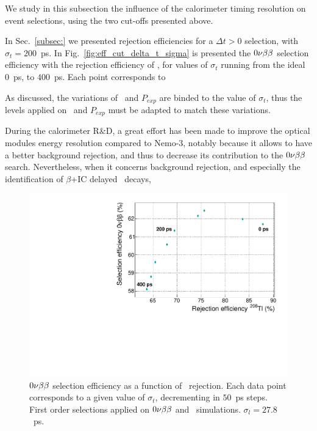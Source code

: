 We study in this subsection the influence of the calorimeter timing resolution on event selections, using the two cut-offs presented above.

In Sec.~\ref{subsec:} we presented rejection efficiencies for a ${\Delta t>0}$ selection, with ${\sigma_{t}=200}$~ps.
In Fig.~\ref{fig:eff_cut_delta_t_sigma} is presented the $0\nu\beta\beta$ selection efficiency with the rejection efficiency of \Tl, for values of $\sigma_{t}$ running from the ideal $0$~ps, to $400$~ps.
Each point corresponds to

As discussed, the variations of \Pint\ and $P_{exp}$ are binded to the value of $\sigma_{t}$, thus the levels applied on \Pint\ and $P_{exp}$ must be adapted to match these variations.


During the calorimeter R\&D, a great effort has been made to improve the optical modules energy resolution compared to Nemo-$3$, notably because it allows to have a better background rejection, and thus to decrease its contribution to the $0\nu\beta\beta$ search.
Nevertheless, when it concerns background rejection, and especially the identification of $\beta$+IC delayed \Tl\ decays,


\begin{figure}[!h]
  \centering
  \includegraphics[width=13cm]{timedifference/fig_timediff/efficiency_proba.pdf}
  \caption{$0\nu\beta\beta$ selection efficiency as a function of \Tl\ rejection.
    Each data point corresponds to a given value of $\sigma_{t}$, decrementing in $50$~ps steps.
    First order selections applied on $0\nu\beta\beta$ and \Tl\ simulations.
    $\sigma_{l}=27.8$~ps.
    \label{fig:eff_proba_sigma}}
\end{figure}

